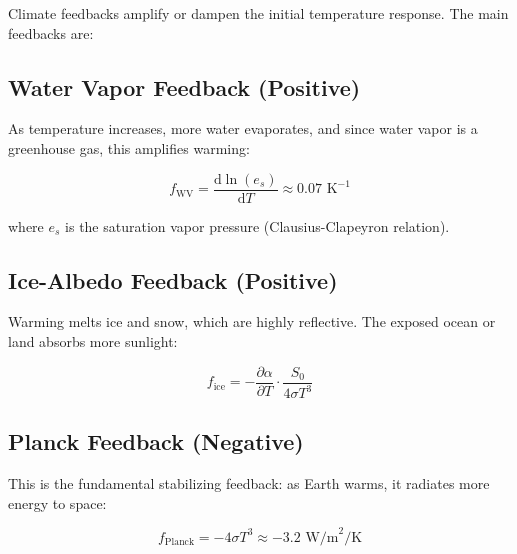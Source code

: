 \documentclass[11pt,a4paper]{article}
\newcommand{\dd}{\mathrm{d}}
\begin{document}
Climate feedbacks amplify or dampen the initial temperature response. The main feedbacks are:

\subsection{Water Vapor Feedback (Positive)}

As temperature increases, more water evaporates, and since water vapor is a greenhouse gas, this amplifies warming:

\begin{equation}
f_{\text{WV}} = \frac{\dd \ln(e_s)}{\dd T} \approx 0.07 \text{ K}^{-1}
\end{equation}

where $e_s$ is the saturation vapor pressure (Clausius-Clapeyron relation).

\subsection{Ice-Albedo Feedback (Positive)}

Warming melts ice and snow, which are highly reflective. The exposed ocean or land absorbs more sunlight:

\begin{equation}
f_{\text{ice}} = -\frac{\partial \alpha}{\partial T} \cdot \frac{S_0}{4\sigma T^3}
\end{equation}

\subsection{Planck Feedback (Negative)}

This is the fundamental stabilizing feedback: as Earth warms, it radiates more energy to space:

\begin{equation}
f_{\text{Planck}} = -4\sigma T^3 \approx -3.2 \text{ W/m}^2/\text{K}
\end{equation}
\end{document}
